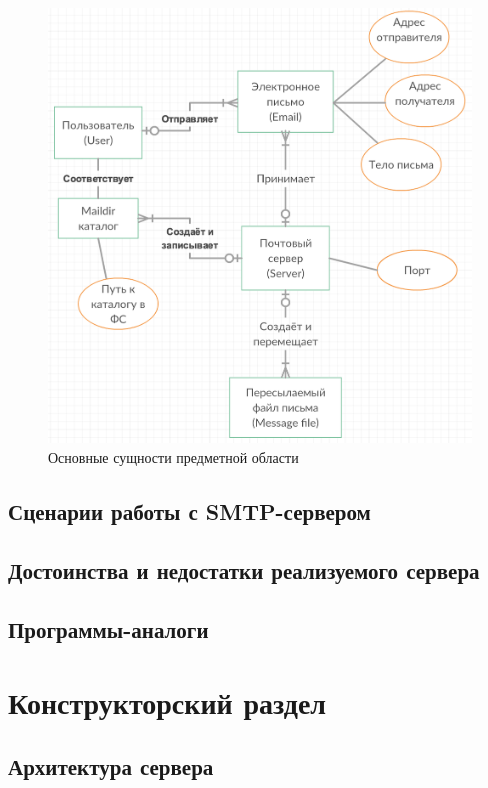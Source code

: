 \documentclass[a4paper,12pt]{report}
\begin{document}
\begin{figure}
\centering
\includegraphics[width=\textwidth]{diagramms/entities.png}
\caption{Основные сущности предметной области}
\label{fig:entities}
\end{figure}


\section{Сценарии работы с SMTP-сервером}

\section{Достоинства и недостатки реализуемого сервера}

\section{Программы-аналоги}


\chapter{Конструкторский раздел}

\section{Архитектура сервера}
\end{document}
